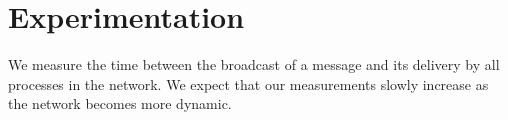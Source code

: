 
\section{Experimentation}
\label{sec:experimentation}

 We measure the time between the broadcast of a
message and its delivery by all processes in the network. We expect that our
measurements slowly increase as the network becomes more dynamic.


